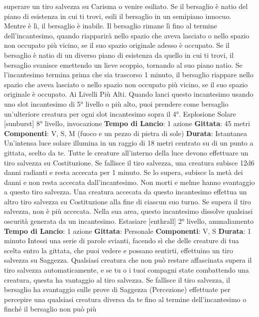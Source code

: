 \begin{multicols}{2}
superare un tiro salvezza su Carisma o venire esiliato.
Se il bersaglio è natio del piano di esistenza in cui ti
trovi, esili il bersaglio in un semipiano innocuo. Mentre è
lì, il bersaglio è inabile. Il bersaglio rimane lì fino al
termine dell’incantesimo, quando riapparirà nello spazio
che aveva lasciato o nello spazio non occupato più
vicino, se il suo spazio originale adesso è occupato.
Se il bersaglio è natio di un diverso piano di esistenza
da quello in cui ti trovi, il bersaglio svanisce emettendo
un lieve scoppio, tornando al suo piano natio. Se
l’incantesimo termina prima che sia trascorso 1 minuto,
il bersaglio riappare nello spazio che aveva lasciato o
nello spazio non occupato più vicino, se il suo spazio
originale è occupato.
Ai Livelli Più Alti. Quando lanci questo incantesimo
usando uno slot incantesimo di 5° livello o più alto, puoi
prendere come bersaglio un’ulteriore creatura per ogni
slot incantesimo sopra il 4°.
Esplosione Solare
[sunburst]
8° livello, invocazione
\textbf{Tempo di Lancio}: 1 azione
\textbf{Gittata}: 45 metri
\textbf{Componenti}: V, S, M (fuoco e un pezzo di pietra di
sole)
\textbf{Durata}: Istantanea
Un’intensa luce solare illumina in un raggio di 18 metri
centrato su di un punto a gittata, scelto da te. Tutte le
creature all’interno della luce devono effettuare un tiro
salvezza su Costituzione. Se fallisce il tiro salvezza,
una creatura subisce 12d6 danni radianti e resta
accecata per 1 minuto. Se lo supera, subisce la metà
dei danni e non resta accecata dall’incantesimo. Non
morti e melme hanno svantaggio a questo tiro salvezza.
Una creatura accecata da questo incantesimo effettua
un altro tiro salvezza su Costituzione alla fine di ciascun
suo turno. Se supera il tiro salvezza, non è più
accecata.
Nella sua area, questo incantesimo dissolve qualsiasi
oscurità generata da un incantesimo.
Estasiare
[enthrall]
2° livello, ammaliamento
\textbf{Tempo di Lancio}: 1 azione
\textbf{Gittata}: Personale
\textbf{Componenti}: V, S
\textbf{Durata}: 1 minuto
Intessi una serie di parole svianti, facendo sì che delle
creature di tua scelta entro la gittata, che puoi vedere e
possano sentirti, effettuino un tiro salvezza su
Saggezza. Qualsiasi creatura che non può restare
affascinata supera il tiro salvezza automaticamente, e
se tu o i tuoi compagni state combattendo una creatura,
questa ha vantaggio al tiro salvezza. Se fallisce il tiro
salvezza, il bersaglio ha svantaggio sulle prove di
Saggezza (Percezione) effettuate per percepire una
qualsiasi creatura diversa da te fino al termine
dell’incantesimo o finché il bersaglio non può più

\end{multicols}
